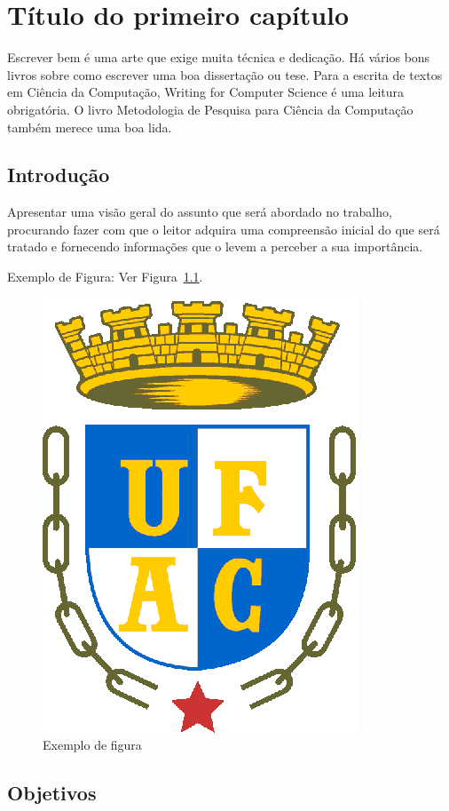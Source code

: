 \chapter{T\'itulo do primeiro cap\'itulo} \label{cap:cap1}

Escrever bem é uma arte que exige muita técnica e dedicação. Há vários bons livros sobre como escrever uma boa dissertação ou tese. Para a escrita de textos em Ciência da Computação, Writing for Computer Science \cite{zobel2014} é uma leitura obrigatória. O livro Metodologia de Pesquisa para Ciência da Computação \cite{wazlawick2009} também merece uma boa lida. 

\section{Introdu\c{c}\~ao}\label{sec:intro}

Apresentar uma visão geral do assunto que será abordado no trabalho, procurando fazer com que o leitor adquira uma compreensão inicial do que será tratado e fornecendo informações que o levem a perceber a sua importância.  

Exemplo de Figura: Ver Figura~\ref{fig:exefig}.

\begin{figure}[!ht]
\centering
\includegraphics[width=0.3\linewidth]{figuras/exefig.eps}
\caption{Exemplo de figura}
\label{fig:exefig}
\end{figure}

\section{Objetivos}\label{sec:intro}

